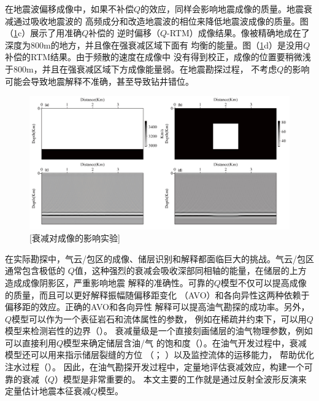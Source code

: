 在地震波偏移成像中，如果不补偿$Q$的效应，同样会影响地震成像的质量。地震衰减通过吸收地震波的
高频成分和改造地震波的相位来降低地震波成像的质量。图（\ref{fig:qrtm}c）展示了用准确$Q$补偿的
逆时偏移（$Q$-RTM）成像结果。像被精确地成在了深度为800m的地方，并且像在强衰减区域下面有
均衡的能量。图（\ref{fig:qrtm}d）是没用$Q$补偿的RTM结果。由于频散的速度在成像中
没有得到校正，成像的位置要稍微浅于800m，并且在强衰减区域下方成像能量弱。在地震勘探过程，
不考虑$Q$的影响可能会导致地震解释不准确，甚至导致钻井错位。

\begin{figure}[!htbp]
        \centering
        \includegraphics[width=1.0\linewidth]{figure/qrtm1.pdf}
		[衰减对成像的影响实验]
        \label{fig:qrtm}
\end{figure}

在实际勘探中，气云/包区的成像、储层识别和解释都面临巨大的挑战。气云/包区通常包含极低的
$Q$值，这种强烈的衰减会吸收深部同相轴的能量，在储层的上方造成成像阴影区，严重影响地震
解释的准确性。可靠的$Q$模型不仅可以提高成像的质量，而且可以更好解释振幅随偏移距变化
（AVO）和各向异性这两种依赖于偏移距的效应。正确的AVO和各向异性
解释可以提高油气勘探的成功率。另外，$Q$模型可以作为一个表征岩石和流体属性的参数，
例如在稀疏井约束下，可以用$Q$模型来检测岩性的边界（）。
衰减量级是一个直接刻画储层的油气物理参数，例如可以直接利用$Q$模型来确定储层含油/气
的饱和度（）。在油气开发过程中，衰减模型还可以用来指示储层裂缝的方位
（； ）以及监控流体的运移能力，
帮助优化注水过程（）。
因此，在油气勘探开发过程中，定量地评估衰减效应，构建一个可靠的衰减（$Q$）模型是非常重要的。
本文主要的工作就是通过反射全波形反演来定量估计地震本征衰减$Q$模型。


